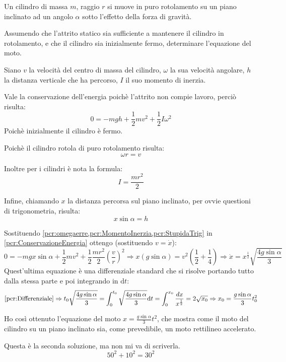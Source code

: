 \documentclass[../main.tex]{subfiles}
\begin{document}
\textex
Un cilindro di massa $m$, raggio $r$ si muove in puro rotolamento su un piano inclinato
ad un angolo $\alpha$ sotto l'effetto della forza di gravità.

Assumendo che l'attrito statico sia sufficiente a mantenere il cilindro in rotolamento, e che il cilindro sia inizialmente
fermo, determinare l'equazione del moto.

\solution
Siano $v$ la velocità del centro di massa del cilindro, $\omega$ la sua velocità angolare,
$h$ la distanza verticale che ha percorso, $I$ il suo momento di inerzia.

Vale la conservazione dell'energia poichè l'attrito non compie lavoro, perciò risulta:
\begin{equation}\label{pcr:ConservazioneEnergia}
	0=-mgh+\frac12mv^2+\frac12 I \omega^2
\end{equation}
Poichè inizialmente il cilindro è fermo.

Poichè il cilindro rotola di puro rotolamento risulta:
\begin{equation}\label{pcr:omegaerre}
	\omega r=v
\end{equation}

Inoltre per i cilindri è nota la formula:
\begin{equation}\label{pcr:MomentoInerzia}
	I=\frac{mr^2}2
\end{equation}

Infine, chiamando $x$ la distanza percorsa sul piano inclinato, per ovvie questioni di trigonometria, risulta:
\begin{equation}\label{pcr:StupidaTrig}
	x\sin{\alpha}=h
\end{equation}

Sostituendo \cref{pcr:omegaerre,pcr:MomentoInerzia,pcr:StupidaTrig} in \cref{pcr:ConservazioneEnergia} ottengo (sostituendo $v=\dot x$):
\begin{equation}\label{pcr:Differenziale}
	0=-mgx\sin{\alpha}+\frac12mv^2+\frac12 \frac{mr^2}2\left(\frac vr\right)^2 \Rightarrow x\left(g\sin{\alpha}\right)=v^2\left(\frac12+\frac14\right)
	\Rightarrow \dot{x}=x^{\frac12}\sqrt{\frac{4g\sin{\alpha}}3}
\end{equation}
Quest'ultima equazione è una differenziale standard che si risolve portando tutto dalla stessa parte e poi integrando in 
$\mathrm{d}t$:
\begin{equation*}
	\cref{pcr:Differenziale}\Rightarrow t_0\sqrt{\frac{4g\sin{\alpha}}3}=\int_0^{t_0}\sqrt{\frac{4g\sin{\alpha}}3}\mathrm{d}t=
	\int_0^{x_0} \frac{dx}{ x^{\frac12} }=2\sqrt{x_0}\Rightarrow x_0=\frac{g\sin{\alpha}}3t_0^2
\end{equation*}

Ho così ottenuto l'equazione del moto $x=\frac{g\sin{\alpha}}3t^2$, che mostra come il moto del cilindro su un 
piano inclinato sia, come prevedibile, un moto rettilineo accelerato.

\solution[2]
Questa è la seconda soluzione, ma non mi va di scriverla.
\begin{equation}\label{pcr:Marameo}
	50^2+10^2=30^2
\end{equation}
\end{document}
